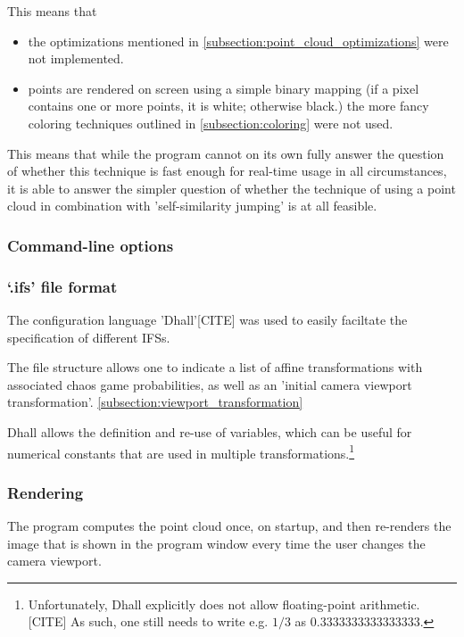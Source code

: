 \documentclass[11pt]{article}
\begin{document}
This means that 

\begin{itemize}
\item the optimizations mentioned in \autoref{subsection:point_cloud_optimizations} were not implemented.
\item points are rendered on screen using a simple binary mapping (if a pixel contains one or more points, it is white; otherwise black.)
the more fancy coloring techniques outlined in \autoref{subsection:coloring} were not used.
\end{itemize}

This means that while the program cannot on its own fully answer the question of whether
this technique is fast enough for real-time usage in all circumstances,
it is able to answer the simpler question of whether the technique of using a point cloud
in combination with 'self-similarity jumping' is at all feasible.

\subsubsection{Command-line options}
\label{sec:org06daff4}

\subsubsection{`.ifs' file format}
\label{sec:orgb12d0ae}

The configuration language 'Dhall'[CITE] was used to 
easily faciltate the specification of different IFSs.

The file structure allows one to indicate a list of affine transformations with associated chaos game probabilities,
as well as an 'initial camera viewport transformation'. \autoref{subsection:viewport_transformation}

Dhall allows the definition and re-use of variables, which can be useful
for numerical constants that are used in multiple transformations.\footnote{Unfortunately, Dhall explicitly does not allow floating-point arithmetic.[CITE]
As such, one still needs to write e.g. \(1/3\) as \(0.3333333333333333\).}


\subsubsection{Rendering}
\label{sec:orgf881a18}
The program computes the point cloud once, on startup, and then re-renders the image that is shown in the program window
every time the user changes the camera viewport.
\end{document}
